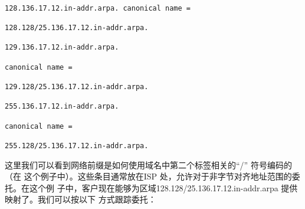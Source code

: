 \begin{verbatim}
    
128.136.17.12.in-addr.arpa. canonical name =

128.128/25.136.17.12.in-addr.arpa.

129.136.17.12.in-addr.arpa.

canonical name =

129.128/25.136.17.12.in-addr.arpa.

255.136.17.12.in-addr.arpa.

canonical name =

255.128/25.136.17.12.in-addr.arpa.
\end{verbatim}

这里我们可以看到网络前缀是如何使用域名中第二个标签相关的“/” 符号编码的（在
这个例子中）。这些条目通常放在ISP 处，允许对于非字节对齐地址范围的委托。在这个例
子中，客户现在能够为区域128.128/25.136.17.12.in-addr.arpa 提供映射了。我们可以按以下
方式跟踪委托：

